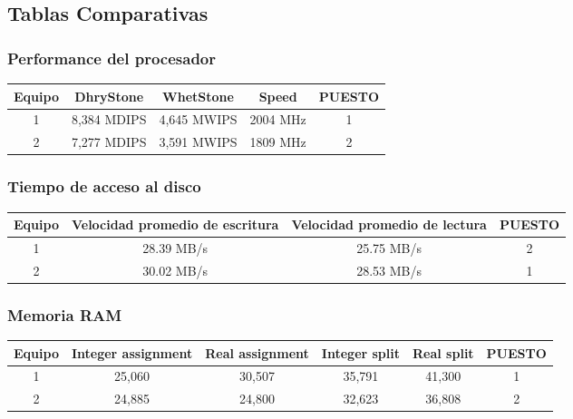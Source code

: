 \subsection{Tablas Comparativas}

\subsubsection{Performance del procesador}
\begin{center}
\begin{tabular}{|ccccc|} \hline
\footnotesize\textbf{Equipo} & \footnotesize\textbf{DhryStone} & \footnotesize\textbf{WhetStone} & \footnotesize\textbf{Speed} & \footnotesize\textbf{PUESTO} \\\hline
1 & 8,384 MDIPS & 4,645 MWIPS & 2004 MHz & 1 \\\hline
2 & 7,277 MDIPS & 3,591 MWIPS & 1809 MHz & 2 \\\hline
\end{tabular}
\end{center}

\subsubsection{Tiempo de acceso al disco}
\begin{center}
\begin{tabular}{|cccc|} \hline
\footnotesize\textbf{Equipo} & \footnotesize\textbf{Velocidad promedio de escritura} & \footnotesize\textbf{Velocidad promedio de lectura} & \footnotesize\textbf{PUESTO} \\\hline
1 & 28.39 MB/s & 25.75 MB/s & 2 \\\hline
2 & 30.02 MB/s & 28.53 MB/s & 1 \\\hline
\end{tabular}
\end{center}

\subsubsection{Memoria RAM}
\begin{center}
\begin{tabular}{|cccccc|} \hline
\footnotesize\textbf{Equipo} & \footnotesize\textbf{Integer assignment} & \footnotesize\textbf{Real assignment} & \footnotesize\textbf{Integer split} & \footnotesize\textbf{Real split} & \footnotesize\textbf{PUESTO} \\\hline
1 & 25,060 & 30,507 & 35,791 & 41,300 & 1 \\\hline
2 & 24,885 & 24,800 & 32,623 & 36,808 & 2 \\\hline
\end{tabular}
\end{center}

